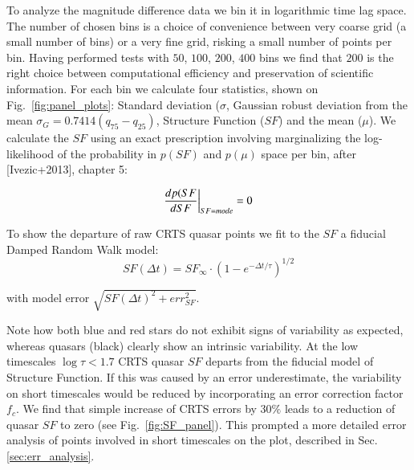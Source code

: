 \documentclass[a4paper,fleqn,usenatbib]{mnras}
\begin{document}
To analyze the magnitude difference data we bin it in logarithmic time lag space. The number of chosen bins is a choice of convenience between very coarse grid (a small number of bins) or a very fine grid, risking a small number of points per bin. Having performed tests  with $50$, $100$, $200$, $400$ bins we find that $200$ is the right choice between computational efficiency and preservation of scientific information. For each bin we calculate four statistics, shown on Fig.~\ref{fig:panel_plots}: Standard deviation ($\sigma$, Gaussian robust deviation from the mean $\sigma_{G}=0.7414 (q_{75}-q_{25})$, Structure Function ($SF$) and the mean ($\mu$).  We calculate the $SF$ using an exact prescription involving marginalizing the log-likelihood of the probability in $p(SF)$ and $p(\mu)$ space per bin, after [Ivezic+2013], chapter 5: 
 
\begin{equation}
\centering
\frac{d p(SF}{d SF } \bigg| _{SF = mode} = 0
\end{equation}

To show the departure of raw CRTS quasar points we fit to the $SF$ a  fiducial Damped Random Walk model:
\begin{equation}
SF(\Delta t) = SF_{\infty} \cdot \left( 1-e^{-\Delta t / \tau} \right) ^ {1/2}
\end{equation}

with model error $\sqrt{SF(\Delta t) ^ {2} + err_{SF} ^ {2}}$. 

Note how both blue and red stars do not exhibit signs of variability as expected, whereas quasars (black) clearly show an intrinsic variability. At the low timescales $\log{\tau} < 1.7$ CRTS quasar $SF$ departs from the fiducial model of Structure Function. 
If this was caused by an error underestimate, the variability on short timescales would be reduced by incorporating an error correction factor $f_{c}$. We find that simple increase of CRTS errors by $30\%$ leads to a reduction of quasar $SF$  to zero (see Fig.~\ref{fig:SF_panel}). This prompted a more detailed error analysis of points involved in short timescales on the plot, described in Sec.\ref{sec:err_analysis}. 
 
\end{document}
